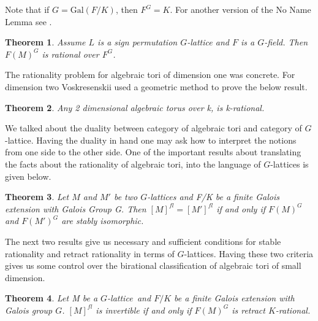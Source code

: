 \documentclass{article}
\theoremstyle{plain}
\newtheorem{theorem}{Theorem}
\theoremstyle{definition}
\newcommand{\G}{G}
\newcommand{\glat}{$G$-lattice}
\begin{document}
\noindent
Note that if $\G = \mathrm{Gal} (F/K)$, then $F^\G = K$. For another version of the 
No Name Lemma see \cite{Domokos}.
\begin{theorem}\cite[Proposition 9.5.1]{Lorenz}\label{SignPermRational}
Assume $L$ is a sign permutation $G$-lattice and $F$ is a $G$-field. Then $F(M)^G$ 
is rational over $F^G$.
\end{theorem}
\noindent
The rationality problem for algebraic tori of dimension one was concrete. For 
dimension two Voskresenskii used a geometric method to prove the below result. 
\begin{theorem}
\cite{Vos67} Any 2 dimensional algebraic torus over k, is k-rational.
\end{theorem} 
\noindent
We talked about the duality between category of algebraic tori and category of \glat . 
Having the duality in hand one may ask how to interpret the notions from one side to 
the other side. One of the important results about translating the facts about the 
rationality of algebraic tori, into the language of \glat s is given below.
\begin{theorem}\cite{Vos74}
Let $M$ and $M'$ be two \glat s  and F/K be a finite Galois extension with Galois 
Group \G . Then $[M]^{fl}=[M']^{fl}$ if and only if $ F(M)^\G $ and $ F(M')^\G$ are 
stably isomorphic.
\end{theorem}
\noindent
The next two results give us necessary and sufficient conditions for stable rationality 
and retract rationality in terms of \glat  s. Having these two criteria gives us some 
control over the birational classification of algebraic tori of small dimension.
\begin{theorem}\cite[Theorem 9.5.4]{Lorenz} Let M be a \glat \,
and $F/K$ be a finite Galois extension with Galois group $G$. $[M]^{fl}$ is invertible 
if and only if $F(M)^\G$ is retract $K$-rational.
\end{theorem}
\end{document}
